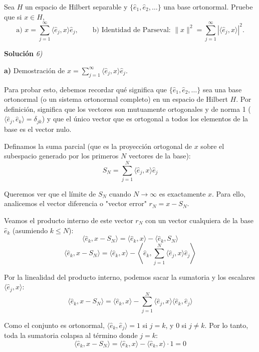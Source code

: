 \documentclass[11pt,spanish]{article}
\newcounter{problema}
\newcommand{\prob}{\stepcounter{problema} \vspace{.5cm} \noindent{\bf Problema \arabic{problema}: }}
\begin{document}
\prob Sea $H$ un espacio de Hilbert separable y $\{\hat{e}_1,\hat{e}_2,\dots\}$ una base ortonormal. Pruebe que si $x\in H$,
\[
\text{a) } x = \sum_{j=1}^{\infty} \langle \hat{e}_j, x \rangle \hat{e}_j, \qquad
\text{b) Identidad de Parseval: } \|x\|^2 = \sum_{j=1}^{\infty} |\langle \hat{e}_j, x \rangle|^2.
\]

\vspace{0.5cm}
{\bf Soluci\'on }{\em 6)}
\vspace{0.5cm}

{\bf a)}
Demostración de $x = \sum_{j=1}^{\infty} \langle \hat{e}_j, x \rangle \hat{e}_j$.

Para probar esto, debemos recordar qué significa que $\{\hat{e}_1, \hat{e}_2, \dots\}$ sea una base ortonormal (o un sistema ortonormal completo) en un espacio de Hilbert $H$. Por definición, significa que los vectores son mutuamente ortogonales y de norma 1 ($\langle \hat{e}_j, \hat{e}_k \rangle = \delta_{jk}$) y que el único vector que es ortogonal a todos los elementos de la base es el vector nulo.

Definamos la suma parcial (que es la proyección ortogonal de $x$ sobre el subespacio generado por los primeros $N$ vectores de la base):
$$S_N = \sum_{j=1}^N \langle \hat{e}_j, x \rangle \hat{e}_j$$

Queremos ver que el límite de $S_N$ cuando $N \to \infty$ es exactamente $x$. Para ello, analicemos el vector diferencia o "vector error" $r_N = x - S_N$. 

Veamos el producto interno de este vector $r_N$ con un vector cualquiera de la base $\hat{e}_k$ (asumiendo $k \le N$):
$$\langle \hat{e}_k, x - S_N \rangle = \langle \hat{e}_k, x \rangle - \langle \hat{e}_k, S_N \rangle$$
$$\langle \hat{e}_k, x - S_N \rangle = \langle \hat{e}_k, x \rangle - \left\langle \hat{e}_k, \sum_{j=1}^N \langle \hat{e}_j, x \rangle \hat{e}_j \right\rangle$$

Por la linealidad del producto interno, podemos sacar la sumatoria y los escalares $\langle \hat{e}_j, x \rangle$:
$$\langle \hat{e}_k, x - S_N \rangle = \langle \hat{e}_k, x \rangle - \sum_{j=1}^N \langle \hat{e}_j, x \rangle \langle \hat{e}_k, \hat{e}_j \rangle$$

Como el conjunto es ortonormal, $\langle \hat{e}_k, \hat{e}_j \rangle = 1$ si $j=k$, y $0$ si $j \neq k$. Por lo tanto, toda la sumatoria colapsa al término donde $j=k$:
$$\langle \hat{e}_k, x - S_N \rangle = \langle \hat{e}_k, x \rangle - \langle \hat{e}_k, x \rangle \cdot 1 = 0$$
\end{document}
